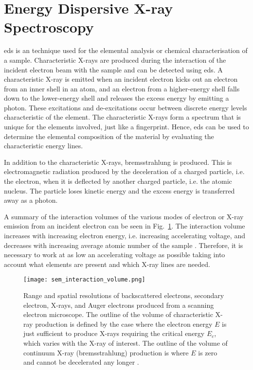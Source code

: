 \section{Energy Dispersive X-ray Spectroscopy}\label{sec:eds}%
\Acf{eds} is an technique used for the elemental analysis or chemical characterisation of a sample. Characteristic X-rays are produced during the interaction of the incident electron beam with the sample and can be detected using \ac{eds}. A characteristic X-ray is emitted when an incident electron kicks out an electron from an inner shell in an atom, and an electron from a higher-energy shell falls down to the lower-energy shell and releases the excess energy by emitting a photon. These excitations and de-excitations occur between discrete energy levels characteristic of the element. The characteristic X-rays form a spectrum that is unique for the elements involved, just like a fingerprint. Hence, \ac{eds} can be used to determine the elemental composition of the material by evaluating the characteristic energy lines. 

In addition to the characteristic X-rays, bremsstrahlung is produced. This is electromagnetic radiation produced by the deceleration of a charged particle, i.e. the electron, when it is deflected by another charged particle, i.e. the atomic nucleus. The particle loses kinetic energy and the excess energy is transferred away as a photon.

A summary of the interaction volumes of the various modes of electron or X-ray emission from an incident electron can be seen in Fig.~\ref{fig:sem_interaction_volume}. The interaction volume increases with increasing electron energy, i.e. increasing accelerating voltage, and decreases with increasing average atomic number of the sample \citep{goldstein2012scanning}. Therefore, it is necessary to work at as low an accelerating voltage as possible taking into account what elements are present and which X-ray lines are needed.%

\begin{figure}[htbp]
    \centering
    \texttt{[image: sem\_interaction\_volume.png]}
    \caption[Range and spatial resolutions of backscattered electrons, secondary electron, X-rays, and Auger electrons produced from a SEM.]{Range and spatial resolutions of backscattered electrons, secondary electron, X-rays, and Auger electrons produced from a scanning electron microscope. The outline of the volume of characteristic X-ray production is defined by the case where the electron energy $E$ is just sufficient to produce X-rays requiring the critical energy $E_c$, which varies with the X-ray of interest. The outline of the volume of continuum X-ray (bremsstrahlung) production is where $E$ is zero and cannot be decelerated any longer \citep[Reprinted from][]{goldstein2012scanning}.}
    \label{fig:sem_interaction_volume}
\end{figure}

